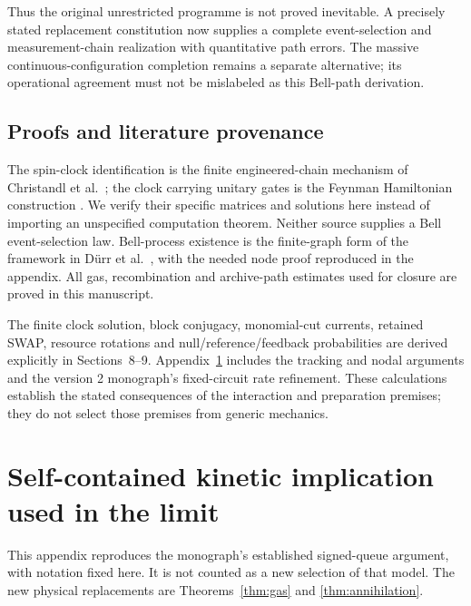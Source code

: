 \documentclass[11pt]{article}
\theoremstyle{definition}\newtheorem{definition}[theorem]{Definition}
\theoremstyle{remark}\newtheorem{remark}[theorem]{Remark}
\begin{document}
Thus the original unrestricted programme is not proved inevitable. A precisely stated replacement constitution now supplies a complete event-selection and measurement-chain realization with quantitative path errors. The massive continuous-configuration completion \cite{MassiveCompletion} remains a separate alternative; its operational agreement must not be mislabeled as this Bell-path derivation.

\subsection{Proofs and literature provenance}
The spin-clock identification is the finite engineered-chain mechanism of Christandl et al.\ \cite{Christandl2004}; the clock carrying unitary gates is the Feynman Hamiltonian construction \cite{Feynman1986}. We verify their specific matrices and solutions here instead of importing an unspecified computation theorem. Neither source supplies a Bell event-selection law. Bell-process existence is the finite-graph form of the framework in D\"urr et al.\ \cite{Bell2005}, with the needed node proof reproduced in the appendix. All gas, recombination and archive-path estimates used for closure are proved in this manuscript.

The finite clock solution, block conjugacy, monomial-cut currents, retained SWAP, resource rotations and null/reference/feedback probabilities are derived explicitly in Sections~8--9. Appendix~\ref{app:kinetic} includes the tracking and nodal arguments and the version 2 monograph's fixed-circuit rate refinement. These calculations establish the stated consequences of the interaction and preparation premises; they do not select those premises from generic mechanics.


\appendix

\section{Self-contained kinetic implication used in the limit}\label{app:kinetic}
This appendix reproduces the monograph's established signed-queue argument, with notation fixed here. It is not counted as a new selection of that model. The new physical replacements are Theorems~\ref{thm:gas} and \ref{thm:annihilation}.
\end{document}
